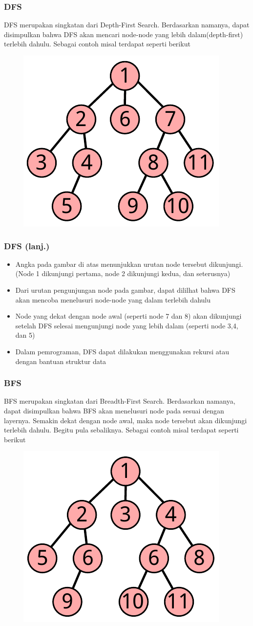 \begin{frame}
\frametitle{DFS}

\alert{DFS} merupakan singkatan dari Depth-First Search. Berdasarkan namanya, dapat disimpulkan bahwa DFS akan mencari node-node yang lebih dalam(depth-first) terlebih dahulu. Sebagai contoh misal terdapat \fgraph seperti berikut

\begin{figure}
  \centering
  \includegraphics[width=5 cm]{asset/dfs.pdf}
\end{figure}
\end{frame}

\begin{frame}
\frametitle{DFS (lanj.)}
\begin{itemize}
  \item Angka pada gambar di atas menunjukkan urutan node tersebut dikunjungi. (Node 1 dikunjungi pertama, node 2 dikunjungi kedua, dan seterusnya)
  \item Dari urutan pengunjungan node pada gambar, dapat dililhat bahwa DFS akan mencoba menelusuri node-node yang dalam terlebih dahulu
  \item Node yang dekat dengan node awal (seperti node 7 dan 8) akan dikunjungi setelah DFS selesai mengunjungi node yang lebih dalam (seperti node 3,4, dan 5)
  \item Dalam pemrograman, DFS dapat dilakukan menggunakan rekursi atau dengan bantuan struktur data 
\end{itemize}
\end{frame}

\begin{frame}
\frametitle{BFS}

\alert{BFS} merupakan singkatan dari Breadth-First Search. Berdasarkan namanya, dapat disimpulkan bahwa BFS akan menelusuri node pada \fgraph sesuai dengan layernya. Semakin dekat dengan node awal, maka node tersebut akan dikunjungi terlebih dahulu. Begitu pula sebaliknya. Sebagai contoh misal terdapat \fgraph seperti berikut

\begin{figure}
  \centering
  \includegraphics[width=5 cm]{asset/bfs.pdf}
\end{figure}

\end{frame}

